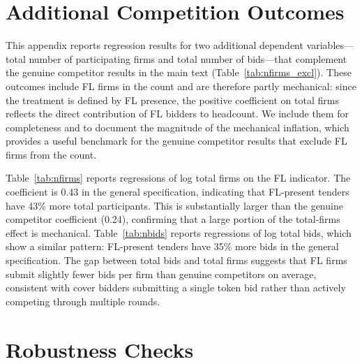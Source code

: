 
\section{Additional Competition Outcomes}
\label{app:competition}

This appendix reports regression results for two additional dependent variables---total number of participating firms and total number of bids---that complement the genuine competitor results in the main text (Table~\ref{tab:nfirms_excl}). These outcomes include FL firms in the count and are therefore partly mechanical: since the treatment is defined by FL presence, the positive coefficient on total firms reflects the direct contribution of FL bidders to headcount. We include them for completeness and to document the magnitude of the mechanical inflation, which provides a useful benchmark for the genuine competitor results that exclude FL firms from the count.

Table~\ref{tab:nfirms} reports regressions of log total firms on the FL indicator. The coefficient is 0.43 in the general specification, indicating that FL-present tenders have 43\% more total participants. This is substantially larger than the genuine competitor coefficient (0.24), confirming that a large portion of the total-firms effect is mechanical. Table~\ref{tab:nbids} reports regressions of log total bids, which show a similar pattern: FL-present tenders have 35\% more bids in the general specification. The gap between total bids and total firms suggests that FL firms submit slightly fewer bids per firm than genuine competitors on average, consistent with cover bidders submitting a single token bid rather than actively competing through multiple rounds.




\section{Robustness Checks}
\label{app:robustness}

